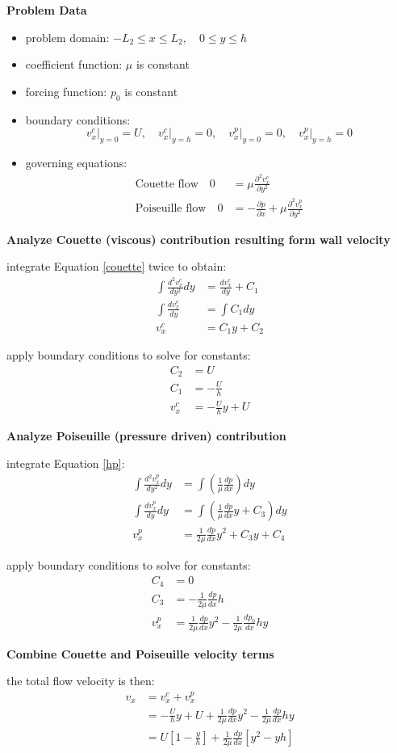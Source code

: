 \documentclass[letterpaper, 10pt, oneside]{article}
\newenvironment{dd}[1]{
	\noindent
	\textbf{\normalsize{#1}}
	\hspace{0.1in}
	\small
	\rmfamily
	}
	{\medskip}
\newcommand{\as}[1]{\begin{align*}#1\end{align*}}
\newcommand{\an}[1]{\begin{align}#1\end{align}}
\newcommand{\bdd}{\begin{dd}}
\newcommand{\edd}{\end{dd}}
\newcommand{\bi}{\begin{itemize}}
\newcommand{\ei}{\end{itemize}}
\begin{document}
\bdd{Problem Data}
	\bi
		\item problem domain: $-L_2\le x \le L_2, \quad 0 \le y \le h$
		\item coefficient function: $\mu$ is constant
		\item forcing function: $p_0$ is constant
		\item boundary conditions:
		$$ v_x^c \Bigr|_{y=0} = U, \quad v_x^c \Bigr|_{y=h}=0, \quad v_x^p \Bigr|_{y=0} = 0, \quad v_x^p \Bigr|_{y=h}=0$$
		\item governing equations:
		\an{\text{Couette flow} \quad 0 &= \mu \frac{\partial^2 v_x^c}{\partial y^2} \label{couette}\\
		\text{Poiseuille flow} \quad 0 &= -\frac{\partial p}{\partial x} + \mu \frac{\partial^2 v_x^p}{\partial y^2} \label{hp} }
	\ei
\edd

\bdd{Analyze Couette (viscous) contribution resulting form wall velocity}

	integrate Equation \ref{couette} twice to obtain:
	\as{\int \frac{d^2 v_x^c}{dy^2} dy &= \frac{dv_x^c}{dy} + C_1 \\\int \frac{dv_x^c}{dy} &= \int C_1 dy \\v_x^c &= C_1y + C_2 }

	apply boundary conditions to solve for constants:
	\as{C_2 &= U \\ C_1 &= -\frac{U}{h}  \\ v_x^c &= -\frac{U}{h}y + U}
\edd

\bdd{Analyze Poiseuille (pressure driven) contribution}

	integrate Equation \ref{hp}:
	\as{\int \frac{d^2 v_x^p}{d y^2} dy &=\int \left( \frac{1}{\mu} \frac{d p}{d x} \right) dy \\
	\int \frac{dv_x^p}{dy} dy &= \int \left( \frac{1}{\mu} \frac{d p}{d x}y + C_3 \right) dy \\
	v_x^p &= \frac{1}{2\mu} \frac{d p}{d x}y^2 + C_3y + C_4 }

	apply boundary conditions to solve for constants:
	\as{C_4 &= 0 \\
	C_3 &= -\frac{1}{2\mu} \frac{d p}{d x}h\\
	v_x^p &= \frac{1}{2\mu} \frac{d p}{d x}y^2 -\frac{1}{2\mu} \frac{d p_0}{d x}hy}
\edd

\bdd{Combine Couette and Poiseuille velocity terms}

	the total flow velocity is then:
	\an{v_x &= v_x^c + v_x^p \\
	&= -\frac{U}{h}y + U+\frac{1}{2\mu} \frac{d p}{d x}y^2 -\frac{1}{2\mu} \frac{d p}{d x}hy\\ &= U\left[1-\frac{y}{h}\right]+\frac{1}{2\mu}\frac{d p}{d x} \left[y^2 -yh\right] \label{vx}}
\edd
\end{document}
